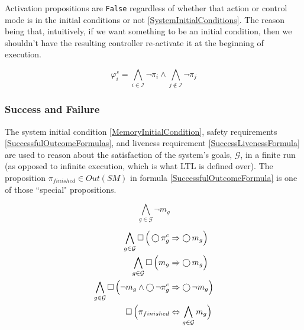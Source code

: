 Activation propositions are \texttt{False} regardless of whether that action or control mode is in the initial conditions or not \eqref{SystemInitialConditions}.
The reason being that, intuitively, if we want something to be an initial condition, then we shouldn't have the resulting controller re-activate it at the beginning of execution.

\begin{equation}\label{SystemInitialConditions}
	\varphi_i^s = \bigwedge \limits_{i \in \mathcal{I}} \lnot \pi_i \wedge \bigwedge \limits_{j \not \in \mathcal{I}} \lnot \pi_j
\end{equation}



\subsubsection{Success and Failure}

The system initial condition \eqref{MemoryInitialCondition}, safety requirements \eqref{SuccessfulOutcomeFormulas}, and liveness requirement \eqref{SuccessLivenessFormula} are used to reason about the satisfaction of the system's goals, $\mathcal{G}$, in a finite run (as opposed to infinite execution, which is what LTL is defined over).
The proposition $\pi_{finished} \in Out(SM)$ in formula \eqref{SuccessfulOutcomeFormula} is one of those ``special" propositions.

\begin{equation}\label{MemoryInitialCondition}
	\bigwedge \limits_{g \in \mathcal{G}} \lnot m_g 
\end{equation}

\begin{subequations}
	\label{SuccessfulOutcomeFormulas}
	\begin{align}
		\bigwedge \limits_{g \in \mathcal{G}} \operatorname{\Box} \Big( \operatorname{\bigcirc} \pi_g^c &\Rightarrow \operatorname{\bigcirc} m_g \Big) \label{SuccessfulOutcomeFormula1}\\
		\bigwedge \limits_{g \in \mathcal{G}}\operatorname{\Box} \Big(  m_g &\Rightarrow \operatorname{\bigcirc} m_g \Big) \label{SuccessfulOutcomeFormula2}\\
		\bigwedge \limits_{g \in \mathcal{G}}\operatorname{\Box} \Big(  \lnot m_g \wedge \operatorname{\bigcirc} \lnot \pi_g^c &\Rightarrow \operatorname{\bigcirc} \lnot m_g \Big) \label{SuccessfulOutcomeFormula3}\\
		\operatorname{\Box} \Big( \pi_{finished} &\Leftrightarrow \bigwedge \limits_{g \in \mathcal{G}} m_g \Big) \label{SuccessfulOutcomeFormula}
	\end{align}
\end{subequations}

